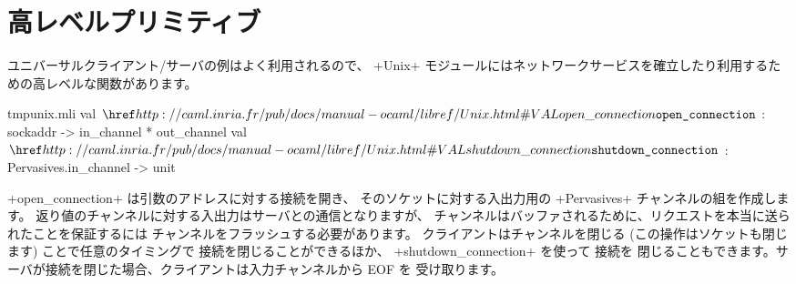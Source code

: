 \section{高レベルプリミティブ}

ユニバーサルクライアント/サーバの例はよく利用されるので、
\ml+Unix+ モジュールにはネットワークサービスを確立したり利用するための高レベルな関数があります。
%
\begin{listingcodefile}{tmpunix.mli}
val $\indexlibvalue{Unix}{open\_connection}$ : sockaddr -> in_channel * out_channel
val $\indexlibvalue{Unix}{shutdown\_connection}$ : Pervasives.in_channel -> unit
\end{listingcodefile}
%
\ml+open_connection+ は引数のアドレスに対する接続を開き、
そのソケットに対する入出力用の \ml+Pervasives+ チャンネルの組を作成します。
返り値のチャンネルに対する入出力はサーバとの通信となりますが、
チャンネルはバッファされるために、リクエストを本当に送られたことを保証するには
チャンネルをフラッシュする必要があります。
クライアントはチャンネルを閉じる (この操作はソケットも閉じます) ことで任意のタイミングで
接続を閉じることができるほか、 \ml+shutdown_connection+ を使って  接続を
閉じることもできます。サーバが接続を閉じた場合、クライアントは入力チャンネルから EOF を
受け取ります。


